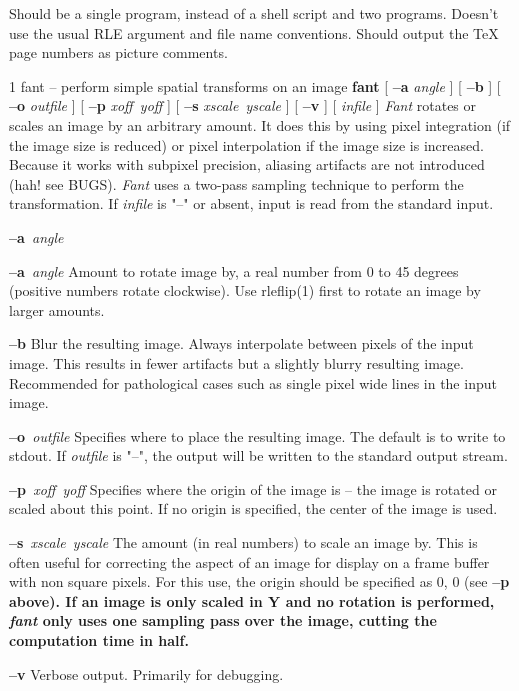 Should be a single program, instead of a shell script and two
programs.  Doesn't use the usual RLE argument and file name
conventions.  Should output the TeX page numbers as picture comments.
\newpage


%
%
%
 1
fant -- perform simple spatial transforms on an image
{\bf fant}
[
{\bf --a}
{\it angle}
] 
[
{\bf --b}
]
[
{\bf --o}
{\it outfile}
]
[
{\bf --p}
{\it xoff\ yoff}
]
[
{\bf --s} 
{\it xscale\ yscale}
]
[
{\bf --v}
]
[ 
{\it infile}
] 
{\it Fant}
rotates or scales an image by an arbitrary amount.  It does this by
using pixel integration (if the image size is reduced) or pixel interpolation
if the image size is increased.  Because it works with subpixel precision,
aliasing artifacts are not introduced (hah! see BUGS).  
{\it Fant}
uses a two-pass 
sampling technique to perform the transformation.  If
{\it infile}
is "--" or absent, input is read from the standard input.
\begin{TPlist}{{\bf --a}{\it \ angle}
}
\item[{{\bf --a}{\it \ angle}
}]
Amount to rotate image by, a real number from 0 to 45 degrees (positive
numbers rotate clockwise).  Use rleflip(1) first to rotate an image by larger
amounts.
\item[{{\bf --b}}]
Blur the resulting image. 
Always interpolate between pixels of the input image.  This results in
fewer artifacts but a slightly blurry resulting image.  Recommended for
pathological cases such as single pixel wide lines in the input image.
\item[{{\bf --o}{\it \ outfile}
}]
Specifies where to place the resulting image.  The default is to write
to stdout.  If
{\it outfile}
is "--", the output will be written to the standard output stream.
\item[{{\bf --p}{\it \ xoff\ yoff}
}]
Specifies where the origin of the image is -- the image is rotated or scaled
about this point.  If no origin is specified, the center of the image is used.
\item[{{\bf --s}{\it \ xscale\ yscale}
}]
The amount (in real numbers) to scale an image by.  This is often
useful for correcting the aspect of an image for display on a frame
buffer with non square pixels.  For this use, the origin should be
specified as 0, 0 (see %
\bf --p \rm%
above).  If an image is only scaled
in Y and no rotation is performed,
{\it fant}
only uses one sampling pass over the image, cutting the computation time
in half.
\item[{{\bf --v}}]
Verbose output.  Primarily for debugging.
\end{TPlist}\par\noindent
